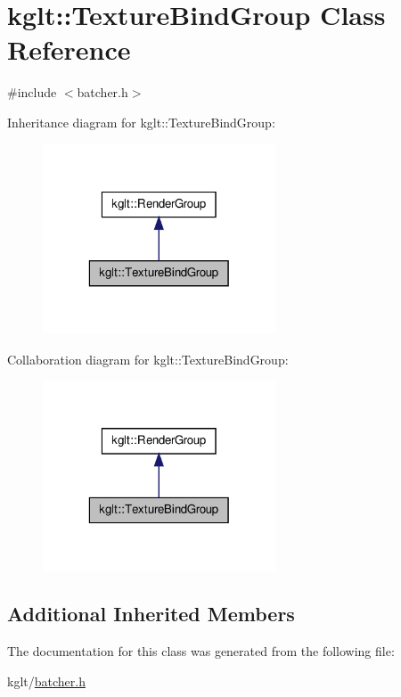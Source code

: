 \hypertarget{classkglt_1_1_texture_bind_group}{\section{kglt\-:\-:Texture\-Bind\-Group Class Reference}
\label{classkglt_1_1_texture_bind_group}
}


{\ttfamily \#include $<$batcher.\-h$>$}



Inheritance diagram for kglt\-:\-:Texture\-Bind\-Group\-:\nopagebreak
\begin{figure}[H]
\begin{center}
\leavevmode
\includegraphics[width=196pt]{classkglt_1_1_texture_bind_group__inherit__graph}
\end{center}
\end{figure}


Collaboration diagram for kglt\-:\-:Texture\-Bind\-Group\-:\nopagebreak
\begin{figure}[H]
\begin{center}
\leavevmode
\includegraphics[width=196pt]{classkglt_1_1_texture_bind_group__coll__graph}
\end{center}
\end{figure}
\subsection*{Additional Inherited Members}


The documentation for this class was generated from the following file\-:\begin{DoxyCompactItemize}
\item 
kglt/\hyperlink{batcher_8h}{batcher.\-h}\end{DoxyCompactItemize}
